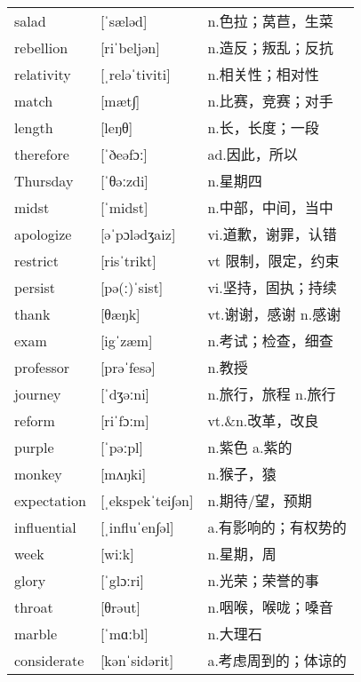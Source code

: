 \documentclass[a4paper]{article}
\begin{document}
\section{}
\begin{tabular}{l l l}

salad & [ˈsæləd] & n.色拉；莴苣，生菜 \\
rebellion & [riˈbeljən] & n.造反；叛乱；反抗 \\
relativity & [ˌreləˈtiviti] & n.相关性；相对性 \\
match & [mæt∫] & n.比赛，竞赛；对手 \\
length & [leŋθ] & n.长，长度；一段 \\
therefore & [ˈðeəfɔː] & ad.因此，所以 \\
Thursday & [ˈθəːzdi] & n.星期四 \\
midst & [ˈmidst] & n.中部，中间，当中 \\
apologize & [əˈpɔlədʒaiz] & vi.道歉，谢罪，认错 \\
restrict & [risˈtrikt] & vt 限制，限定，约束 \\
persist & [pə(ː)ˈsist] & vi.坚持，固执；持续 \\
thank & [θæŋk] & vt.谢谢，感谢 n.感谢 \\
exam & [igˈzæm] & n.考试；检查，细查 \\
professor & [prəˈfesə] & n.教授 \\
journey & [ˈdʒəːni] & n.旅行，旅程 n.旅行 \\
reform & [riˈfɔːm] & vt.\&n.改革，改良 \\
purple & [ˈpəːpl] & n.紫色 a.紫的 \\
monkey & [mʌŋki] & n.猴子，猿 \\
expectation & [ˌekspekˈtei∫ən] & n.期待/望，预期 \\
influential & [ˌinfluˈen∫əl] & a.有影响的；有权势的 \\
week & [wiːk] & n.星期，周 \\
glory & [ˈglɔːri] & n.光荣；荣誉的事 \\
throat & [θrəut] & n.咽喉，喉咙；嗓音 \\
marble & [ˈmɑːbl] & n.大理石 \\
considerate & [kənˈsidərit] & a.考虑周到的；体谅的 \\

\end{tabular}
\end{document}
